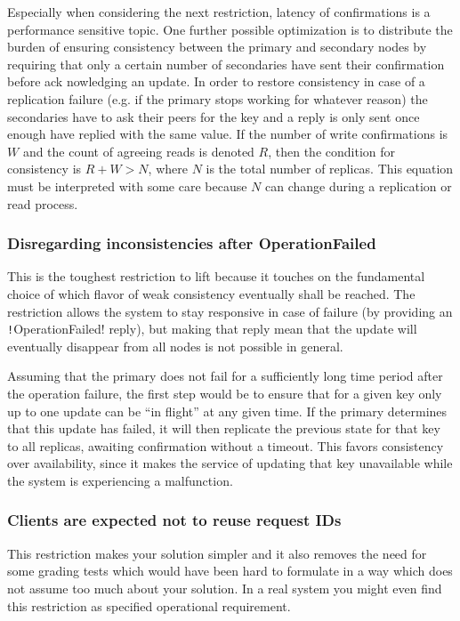 \documentclass{article}
\begin{document}
Especially when considering the next restriction, latency of confirmations is a performance sensitive  topic. One further possible optimization is to distribute the burden of  ensuring consistency between the primary and secondary nodes by  requiring that only a certain number of secondaries have sent their  confirmation before ack	nowledging an update. In order to restore  consistency in case of a replication failure (e.g. if the primary stops  working for whatever reason) the secondaries have to ask their peers for  the key and a reply is only sent once enough have replied with the same  value. If the number of write confirmations is $W$ and the count of  agreeing reads is denoted $R$, then the condition for consistency is  $R+W>N$, where $N$ is the total number of replicas. This equation must be  interpreted with some care because $N$ can change during a replication or read process.

\subsubsection{Disregarding inconsistencies after OperationFailed}

This is the toughest restriction to lift because it touches on the  fundamental choice of which flavor of weak consistency eventually shall  be reached. The restriction allows the system to stay responsive in case  of failure (by providing an \texttt!OperationFailed! reply), but making that reply mean that the update will eventually disappear from all nodes is not possible in general.

Assuming that the primary does not fail for a sufficiently long time  period after the operation failure, the first step would be to ensure  that for a given key only up to one update can be “in flight”  at any given time. If the primary determines that this update has  failed, it will then replicate the previous state for that key to all  replicas, awaiting confirmation without a timeout. This favors  consistency over availability, since it makes the service of updating that key unavailable while the system is experiencing a malfunction.

\subsubsection{Clients are expected not to reuse request IDs}

This restriction makes your solution simpler and it also removes the  need for some grading tests which would have been hard to formulate in a  way which does not assume too much about your solution. In a real system you might even find this restriction as specified operational requirement.
\end{document}
